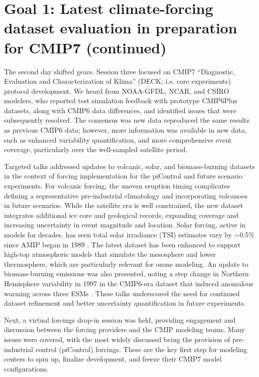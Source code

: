 \documentclass{ametsocV6.1}
\begin{document}
\section*{Goal 1: Latest climate-forcing dataset evaluation in preparation for CMIP7 (continued)}
The second day shifted gears. Session three focused on CMIP7 ``Diagnostic, Evaluation and Characterization of Klima'' (DECK; i.e. core experiments) protocol development. We heard from NOAA-GFDL, NCAR, and CSIRO modelers, who reported test simulation feedback with prototype CMIP6Plus datasets, along with CMIP6 data differences, and identified issues that were subsequently resolved. The consensus was new data reproduced the same results as previous CMIP6 data; however, more information was available in new data, such as enhanced variability quantification, and more comprehensive event coverage, particularly over the well-sampled satellite period.

Targeted talks addressed updates to volcanic, solar, and biomass-burning datasets in the context of forcing implementation for the piControl and future scenario experiments. For volcanic forcing, the uneven eruption timing complicates defining a representative pre-industrial climatology and incorporating volcanoes in future scenarios. While the satellite era is well constrained, the new dataset integrates additional ice core and geological records, expanding coverage and increasing uncertainty in event magnitude and location. Solar forcing, active in models for decades, has seen total solar irradiance (TSI) estimates vary by $\sim$0.5\% since AMIP began in 1989 \citep{durack_coupled_2025}. The latest dataset has been enhanced to support high-top atmospheric models that simulate the mesosphere and lower thermosphere, which are particularly relevant for ozone modeling. An update to biomass-burning emissions was also presented, noting a step change in Northern Hemisphere variability in 1997 in the CMIP6-era dataset that induced anomalous warming across three ESMs \cite[e.g.,][]{fasullo_overview_2024,holland_new_2024}. These talks underscored the need for continued dataset refinement and better uncertainty quantification in future experiments.

Next, a virtual forcings drop-in session was held, providing engagement and discussion between the forcing providers and the CMIP modeling teams. Many issues were covered, with the most widely discussed being the provision of pre-industrial control (piControl) forcings. These are the key first step for modeling centers to spin up, finalize development, and freeze their CMIP7 model configurations.
\end{document}

